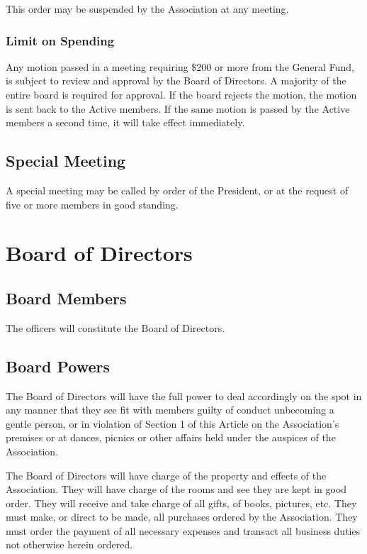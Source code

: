\documentclass[12pt,letterpaper]{article}
\begin{document}
This order may be suspended by the Association at any meeting. 

\subsubsection{Limit on Spending}
Any motion passed in a meeting requiring \$200 or more from the General Fund, is subject to review and approval by the Board of Directors. A majority of the entire board is required for approval. If the board rejects the motion, the motion is sent back to the Active members. If the same motion is passed by the Active members a second time, it will take effect immediately.

\subsection{Special Meeting}
A special meeting may be called by order of the President, or at the request of five or more members in good standing.

\section{Board of Directors}

\subsection{Board Members}
The officers will constitute the Board of Directors.

\subsection{Board Powers}
The Board of Directors will have the full power to deal accordingly on the spot in any manner that they see fit with members guilty of conduct unbecoming a gentle person, or in violation of Section 1 of this Article on the Association's premises or at dances, picnics or other affairs held under the auspices of the Association. 

The Board of Directors will have charge of the property and effects of the Association. They will have charge of the rooms and see they are kept in good order. They will receive and take charge of all gifts, of books, pictures, etc. They must make, or direct to be made, all purchases ordered by the Association. They must order the payment of all necessary expenses and transact all business duties not otherwise herein ordered.
\end{document}

